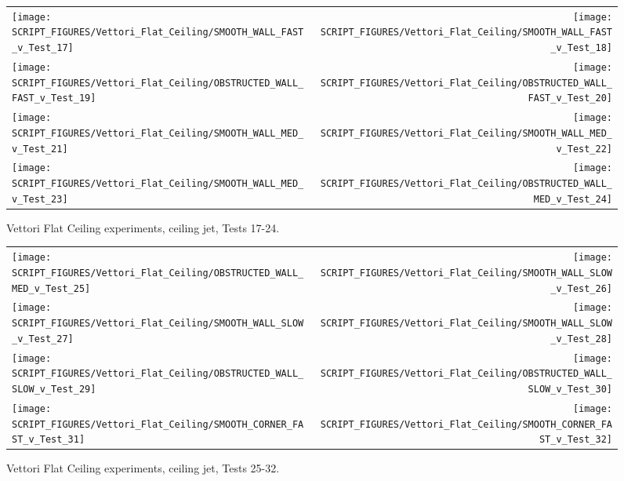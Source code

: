 \begin{figure}[p]
\begin{tabular*}{\textwidth}{l@{\extracolsep{\fill}}r}
\texttt{[image: SCRIPT\_FIGURES/Vettori\_Flat\_Ceiling/SMOOTH\_WALL\_FAST\_v\_Test\_17]} &
\texttt{[image: SCRIPT\_FIGURES/Vettori\_Flat\_Ceiling/SMOOTH\_WALL\_FAST\_v\_Test\_18]} \\
\texttt{[image: SCRIPT\_FIGURES/Vettori\_Flat\_Ceiling/OBSTRUCTED\_WALL\_FAST\_v\_Test\_19]} &
\texttt{[image: SCRIPT\_FIGURES/Vettori\_Flat\_Ceiling/OBSTRUCTED\_WALL\_FAST\_v\_Test\_20]} \\
\texttt{[image: SCRIPT\_FIGURES/Vettori\_Flat\_Ceiling/SMOOTH\_WALL\_MED\_v\_Test\_21]} &
\texttt{[image: SCRIPT\_FIGURES/Vettori\_Flat\_Ceiling/SMOOTH\_WALL\_MED\_v\_Test\_22]} \\
\texttt{[image: SCRIPT\_FIGURES/Vettori\_Flat\_Ceiling/SMOOTH\_WALL\_MED\_v\_Test\_23]} &
\texttt{[image: SCRIPT\_FIGURES/Vettori\_Flat\_Ceiling/OBSTRUCTED\_WALL\_MED\_v\_Test\_24]} \\
\end{tabular*}
\caption{Vettori Flat Ceiling experiments, ceiling jet, Tests 17-24.}
\label{Vettori_3}
\end{figure}

\begin{figure}[p]
\begin{tabular*}{\textwidth}{l@{\extracolsep{\fill}}r}
\texttt{[image: SCRIPT\_FIGURES/Vettori\_Flat\_Ceiling/OBSTRUCTED\_WALL\_MED\_v\_Test\_25]} &
\texttt{[image: SCRIPT\_FIGURES/Vettori\_Flat\_Ceiling/SMOOTH\_WALL\_SLOW\_v\_Test\_26]} \\
\texttt{[image: SCRIPT\_FIGURES/Vettori\_Flat\_Ceiling/SMOOTH\_WALL\_SLOW\_v\_Test\_27]} &
\texttt{[image: SCRIPT\_FIGURES/Vettori\_Flat\_Ceiling/SMOOTH\_WALL\_SLOW\_v\_Test\_28]} \\
\texttt{[image: SCRIPT\_FIGURES/Vettori\_Flat\_Ceiling/OBSTRUCTED\_WALL\_SLOW\_v\_Test\_29]} &
\texttt{[image: SCRIPT\_FIGURES/Vettori\_Flat\_Ceiling/OBSTRUCTED\_WALL\_SLOW\_v\_Test\_30]} \\
\texttt{[image: SCRIPT\_FIGURES/Vettori\_Flat\_Ceiling/SMOOTH\_CORNER\_FAST\_v\_Test\_31]} &
\texttt{[image: SCRIPT\_FIGURES/Vettori\_Flat\_Ceiling/SMOOTH\_CORNER\_FAST\_v\_Test\_32]} \\
\end{tabular*}
\caption{Vettori Flat Ceiling experiments, ceiling jet, Tests 25-32.}
\label{Vettori_4}
\end{figure}

